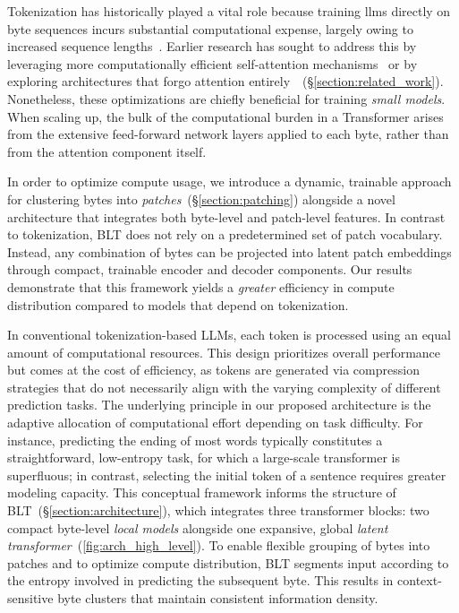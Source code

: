 Tokenization has historically played a vital role because training llms directly on byte sequences incurs substantial computational expense, largely owing to increased sequence lengths~\citep{xue2022byt5}. Earlier research has sought to address this by leveraging more computationally efficient self-attention mechanisms~\citep{el2020characterbert, clark2022canine} or by exploring architectures that forgo attention entirely~\citep{wang2024mambabyte}~(\S\ref{section:related_work}). Nonetheless, these optimizations are chiefly beneficial for training \textit{small models}. When scaling up, the bulk of the computational burden in a Transformer arises from the extensive feed-forward network layers applied to each byte, rather than from the attention component itself.

In order to optimize compute usage, we introduce a dynamic, trainable approach for clustering bytes into \textit{patches}~(\S\ref{section:patching}) alongside a novel architecture that integrates both byte-level and patch-level features. In contrast to tokenization, {\textsc BLT} does not rely on a predetermined set of patch vocabulary. Instead, any combination of bytes can be projected into latent patch embeddings through compact, trainable encoder and decoder components. Our results demonstrate that this framework yields a \textit{greater} efficiency in compute distribution compared to models that depend on tokenization.

In conventional tokenization-based LLMs, each token is processed using an equal amount of computational resources. This design prioritizes overall performance but comes at the cost of efficiency, as tokens are generated via compression strategies that do not necessarily align with the varying complexity of different prediction tasks. The underlying principle in our proposed architecture is the adaptive allocation of computational effort depending on task difficulty. For instance, predicting the ending of most words typically constitutes a straightforward, low-entropy task, for which a large-scale transformer is superfluous; in contrast, selecting the initial token of a sentence requires greater modeling capacity. This conceptual framework informs the structure of {\textsc BLT}~(\S\ref{section:architecture}), which integrates three transformer blocks: two compact byte-level \textit{local models} alongside one expansive, global \textit{latent transformer}~(\autoref{fig:arch_high_level}).
To enable flexible grouping of bytes into patches and to optimize compute distribution, {\textsc BLT} segments input according to the entropy involved in predicting the subsequent byte. This results in context-sensitive byte clusters that maintain consistent information density.

